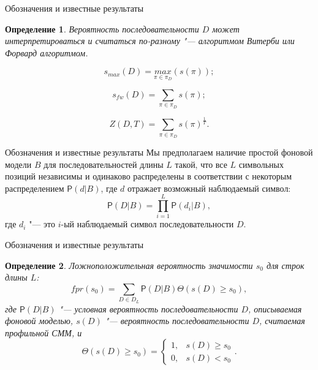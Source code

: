 \documentclass{beamer}
\newtheorem{defenition}{Определение}
\begin{document}
	\begin{frame}{Обозначения и известные результаты}
		\begin{defenition}
			\textit{Вероятность последовательности} $D$ может интерпретироваться и считаться по-разному "--- алгоритмом \textit{Витерби} или \textit{Форвард} алгоритмом.
		\end{defenition}
		
		\begin{equation*}
			s_{max}(D) = \underset{\pi \in \pi_{D}}{max}(s(\pi)); \label{eq:1}
		\end{equation*}
	
		\begin{equation*}
			s_{fw}(D) = \sum_{\pi \in \pi_{D}}s(\pi); \label{eq:2}
		\end{equation*}
	
		\begin{equation*}
			Z(D, T)	= \sum_{\pi \in \pi_{D}}s(\pi)^{\frac{1}{T}}. \label{eq:3}
		\end{equation*}
	\end{frame}	

	\begin{frame}{Обозначения и известные результаты}
		Мы предполагаем наличие простой фоновой модели $B$ для последовательностей длины $L$ такой, что все $L$ символьных позиций независимы и одинаково распределены в соответствии с некоторым распределением $\mathsf{P}(d|B)$, где $d$ отражает возможный наблюдаемый символ:
		\begin{equation*}
			\mathsf{P}(D|B) = \prod_{i=1}^{L}\mathsf{P}(d_{i}|B), \label{eq:4}
		\end{equation*}
		где $d_{i}$ "--- это $i$-ый наблюдаемый символ последовательности $D$.
	\end{frame}

	\begin{frame}{Обозначения и известные результаты}
		\begin{defenition}
			Ложноположительная вероятность значимости $s_{0}$ для строк длины $L$:	
			\begin{equation}
				fpr(s_{0}) =  \sum_{D \in D_{L}} \mathsf{P}(D|B) \Theta(s(D) \geq s_{0}), \label{eq:5}
			\end{equation}
			где $\mathsf{P}(D|B)$ "--- условная вероятность последовательности $D$, описываемая фоновой моделью, $s(D)$ "--- вероятность последовательности $D$, считаемая профильной СММ, и
			\[
			\Theta(s(D) \geq s_{0}) = 
			\begin{cases}
				1, & s(D) \geq s_{0}\\
				0, & s(D) < s_{0}
			\end{cases}.
			\]
		\end{defenition}		
	\end{frame}
	
\end{document}

